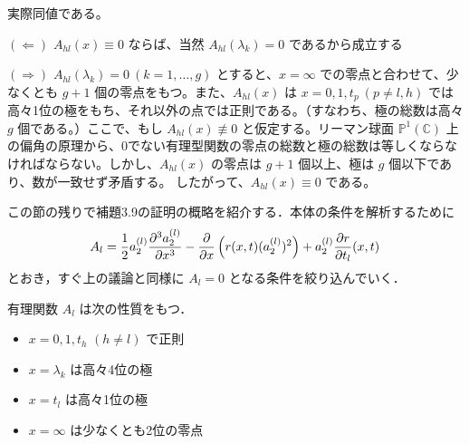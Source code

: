 実際同値である。

$(\Leftarrow)$ \quad $A_{hl}(x) \equiv 0$ ならば、当然 $A_{hl}(\lambda_k) = 0$ であるから成立する

$(\Rightarrow)$ \quad $A_{hl}(\lambda_k) = 0 \ (k=1,\dots,g)$ とすると、$x=\infty$ での零点と合わせて、少なくとも $g+1$ 個の零点をもつ。また、$A_{hl}(x)$ は $x=0, 1, t_p \ (p \neq l, h)$ では高々1位の極をもち、それ以外の点では正則である。（すなわち、極の総数は高々 $g$ 個である。）ここで、もし $A_{hl}(x) \not\equiv 0$ と仮定する。リーマン球面 $\mathbb{P}^1(\mathbb{C})$ 上の偏角の原理から、0でない有理型関数の零点の総数と極の総数は等しくならなければならない。しかし、$A_{hl}(x)$ の零点は $g+1$ 個以上、極は $g$ 個以下であり、数が一致せず矛盾する。
したがって、$A_{hl}(x) \equiv 0$ である。

\begin{story}
この節の残りで補題3.9の証明の概略を紹介する．本体の条件を解析するために
\begin{equation}
    A_l = \frac{1}{2} a_2^{(l)} \frac{\partial^3 a_2^{(l)}}{\partial x^3} - \frac{\partial}{\partial x} \left( r(x,t) (a_2^{(l)})^2 \right) + a_2^{(l)} \frac{\partial r}{\partial t_l} (x,t) \notag
\end{equation}
とおき，すぐ上の議論と同様に $A_l = 0$ となる条件を絞り込んでいく．

\begin{lemma}
    有理関数 $A_l$ は次の性質をもつ．
    \begin{itemize}
        \item[(1)] $x=0, 1, t_h$ $(h \neq l)$ で正則
        \item[(2)] $x=\lambda_k$ は高々4位の極
        \item[(3)] $x=t_l$ は高々1位の極
        \item[(4)] $x=\infty$ は少なくとも2位の零点
    \end{itemize}
\end{lemma}


\end{story}
